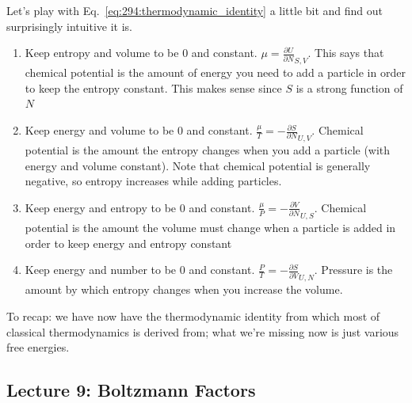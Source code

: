 \documentclass[10pt]{article}
\begin{document}
\begin{example}
	Let's play with Eq.~\ref{eq:294:thermodynamic_identity} a little bit and find out surprisingly intuitive it is.

	\begin{enumerate}
		\item Keep entropy and volume to be $ 0 $ and constant. $ \mu = \frac{\partial U}{\partial N}_{S, V}   $.
			This says that chemical potential is the amount of energy you need to add a particle in order to keep the entropy constant. This makes sense since $ S $ is a strong function of $ N  $ 
		\item Keep energy and volume to be $ 0 $ and constant. $ \frac{\mu}{T} = - \frac{\partial S}{\partial N}_{U, V}   $.
			Chemical potential is the amount the entropy changes when you add a particle (with energy and volume constant). Note that chemical potential is generally negative, so entropy increases while adding particles.
		\item Keep energy and entropy to be $ 0 $ and constant. $ \frac{\mu}{P} = - \frac{\partial V}{\partial N}_{U, S}   $.
			Chemical potential is the amount the volume must change when a particle is added in order to keep energy and entropy constant
		\item Keep energy and number to be $ 0 $ and constant. $ \frac{P}{T} = - \frac{\partial S}{\partial V}_{U, N}   $. 
			Pressure is the amount by which entropy changes when you increase the volume.
	\end{enumerate}
\end{example}

To recap: we have now have the thermodynamic identity from which most of classical thermodynamics is derived from; what we're missing now is just various free energies.


\subsection{Lecture 9: Boltzmann Factors}
\end{document}
